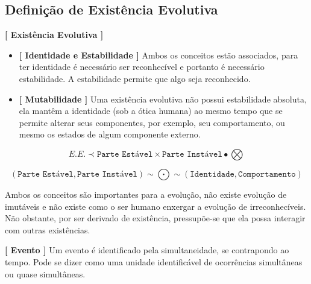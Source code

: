 \documentclass[10pt,a4paper]{report}
\begin{document}
\subsection{Definição de Existência Evolutiva}

\hspace{\baselineskip}

\textbf{[ Existência Evolutiva ]} 

\begin{itemize}
	\item[ (i) ] \textbf{[ Identidade e Estabilidade ]} Ambos os conceitos estão associados, para ter identidade é necessário ser reconhecível e portanto é necessário estabilidade. A estabilidade permite que algo seja reconhecido.
	\item[ (ii) ] \textbf{[ Mutabilidade ]} Uma existência evolutiva não possui estabilidade absoluta, ela mantêm a identidade (sob a ótica humana) ao mesmo tempo que se permite alterar seus componentes, por exemplo, seu comportamento, ou mesmo os estados de algum componente externo.
\end{itemize}

$$ E.E. \prec \texttt{Parte Estável} \times \texttt{Parte Instável} \bullet \bigotimes $$

$$ (\texttt{Parte Estável}, \texttt{Parte Instável}) \sim \bigodot \sim ( \texttt{Identidade}, \texttt{Comportamento} ) $$

Ambos os conceitos são importantes para a evolução, não existe evolução de imutáveis e não existe como o ser humano enxergar a evolução de irreconhecíveis. Não obstante, por ser derivado de existência, pressupõe-se que ela possa interagir com outras existências.

\hspace{\baselineskip}

\textbf{[ Evento ]} Um evento é identificado pela simultaneidade, se contrapondo ao tempo. Pode se dizer como uma unidade identificável de ocorrências simultâneas ou quase simultâneas. \\
\end{document}
